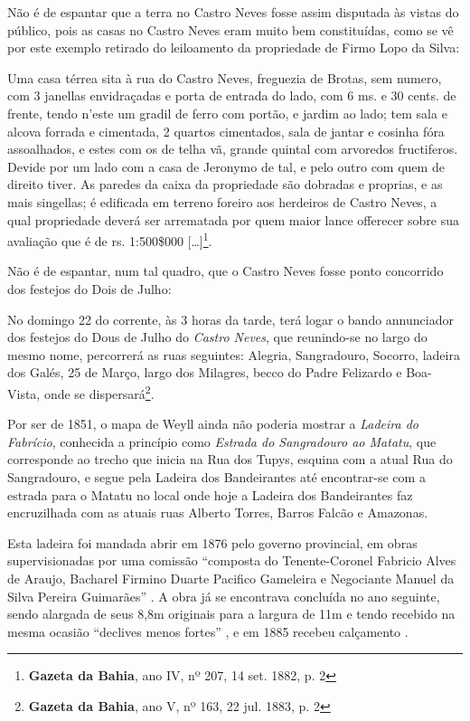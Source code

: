 Não é de espantar que a terra no Castro Neves fosse assim disputada às vistas do público, pois as casas no Castro Neves eram muito bem constituídas, como se vê por este exemplo retirado do leiloamento da propriedade de Firmo Lopo da Silva:

\begin{citacao}
Uma casa térrea sita à rua do Castro Neves, freguezia de Brotas, sem numero, com 3 janellas envidraçadas e porta de entrada do lado, com 6 ms. e 30 cents. de frente, tendo n'este um gradil de ferro com portão, e jardim ao lado; tem sala e alcova forrada e cimentada, 2 quartos cimentados, sala de jantar e cosinha fóra assoalhados, e estes com os de telha vã, grande quintal com arvoredos fructiferos. Devide por um lado com a casa de Jeronymo de tal, e pelo outro com quem de direito tiver. As paredes da caixa da propriedade são dobradas e proprias, e as mais singellas; é edificada em terreno foreiro aos herdeiros de Castro Neves, a qual propriedade deverá ser arrematada por quem maior lance offerecer sobre sua avaliação que é de rs. 1:500\$000 [\dots]\footnote{\textbf{Gazeta da Bahia}, ano IV, nº 207, 14 set. 1882, p. 2}.

Não é de espantar, num tal quadro, que o Castro Neves fosse ponto concorrido dos festejos do Dois de Julho:

\begin{citacao}
No domingo 22 do corrente, às 3 horas da tarde, terá logar o bando annunciador dos festejos do Dous de Julho do \textit{Castro Neves}, que reunindo-se no largo do mesmo nome, percorrerá as ruas seguintes: Alegria, Sangradouro, Socorro, ladeira dos Galés, 25 de Março, largo dos Milagres, becco do Padre Felizardo e Boa-Vista, onde se dispersará\footnote{\textbf{Gazeta da Bahia}, ano V, nº 163, 22 jul. 1883, p. 2}.
\end{citacao}

Por ser de 1851, o mapa de Weyll ainda não poderia mostrar a \textit{Ladeira do Fabrício}, conhecida a princípio como \textit{Estrada do Sangradouro ao Matatu}, que corresponde ao trecho que inicia na Rua dos Tupys, esquina com a atual Rua do Sangradouro, e segue pela Ladeira dos Bandeirantes até encontrar-se com a estrada para o Matatu no local onde hoje a Ladeira dos Bandeirantes faz encruzilhada com as atuais ruas Alberto Torres, Barros Falcão e Amazonas. 

Esta ladeira foi mandada abrir em 1876 pelo governo provincial, em obras supervisionadas por uma comissão ``composta do Tenente-Coronel Fabricio Alves de Araujo, Bacharel Firmino Duarte Pacifico Gameleira e Negociante Manuel da Silva Pereira Guimarães'' \cite[p.~23]{bahia_1878}. A obra já se encontrava concluída no ano seguinte, sendo alargada de seus 8,8m originais para a largura de 11m e tendo recebido na mesma ocasião ``declives menos fortes'' \cite[p.~228]{bahia_1879}, e em 1885 recebeu calçamento \cite[p.~11]{bahia_1885}.


\end{citacao}
